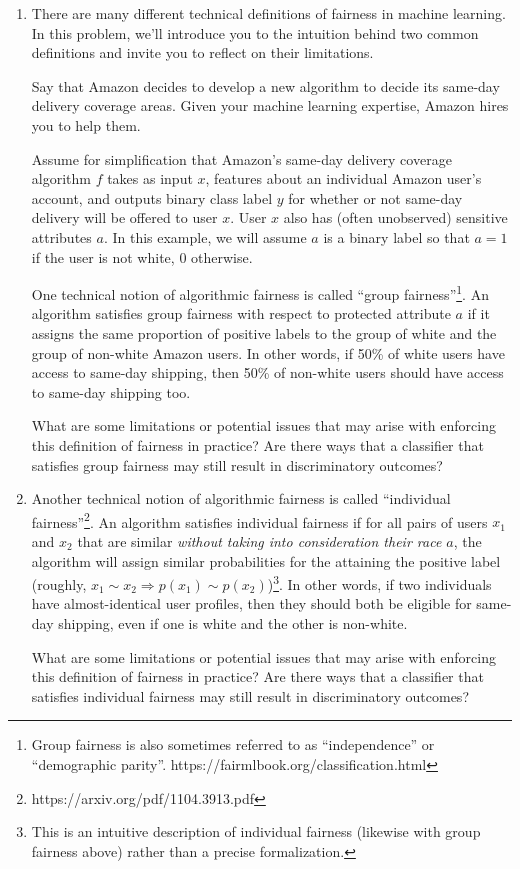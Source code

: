 \documentclass[submit]{harvardml}
\begin{document}
\begin{problem}
\begin{enumerate}
    \item There are many different technical definitions of fairness in machine learning.  In this problem, we'll introduce you to the intuition behind two common definitions and invite you to reflect on their limitations. 
     
    Say that Amazon decides to develop a new algorithm to decide its same-day delivery coverage areas.  Given your machine learning expertise, Amazon hires you to help them.
    
    Assume for simplification that Amazon's same-day delivery coverage algorithm $f$ takes as input $x$, features about an individual Amazon user's account, and outputs binary class label $y$ for whether or not same-day delivery will be offered to user $x$.  User $x$ also has (often unobserved) sensitive attributes $a$.  In this example, we will assume $a$ is a binary label so that $a = 1$ if the user is not white, $0$ otherwise.
    
    One technical notion of algorithmic fairness is called ``group fairness''\footnote{ Group fairness is also sometimes referred to as ``independence'' or ``demographic parity''.  https://fairmlbook.org/classification.html}. An algorithm satisfies group fairness with respect to protected attribute $a$ if it assigns the same proportion of positive labels to the group of white and the group of non-white Amazon users.  In other words, if 50\% of white users have access to same-day shipping, then 50\% of non-white users should have access to same-day shipping too.
    
    What are some limitations or potential issues that may arise with enforcing this definition of fairness in practice?  Are there ways that a classifier that satisfies group fairness may still result in discriminatory outcomes?
    
    \item Another technical notion of algorithmic fairness is called ``individual fairness''\footnote{https://arxiv.org/pdf/1104.3913.pdf}. An algorithm satisfies individual fairness if for all pairs of users $x_1$ and $x_2$ that are similar \emph{without taking into consideration their race $a$}, the algorithm will assign similar probabilities for the attaining the positive label (roughly, $x_1 \sim x_2 \Rightarrow p(x_1) \sim p(x_2)$)\footnote{This is an intuitive description of individual fairness (likewise with group fairness above) rather than a precise formalization.}.  In other words, if two individuals have almost-identical user profiles, then they should both be eligible for same-day shipping, even if one is white and the other is non-white.
    
    What are some limitations or potential issues that may arise with enforcing this definition of fairness in practice?  Are there ways that a classifier that satisfies individual fairness may still result in discriminatory outcomes?
    
\end{enumerate}

\end{problem}
\newpage
\end{document}
